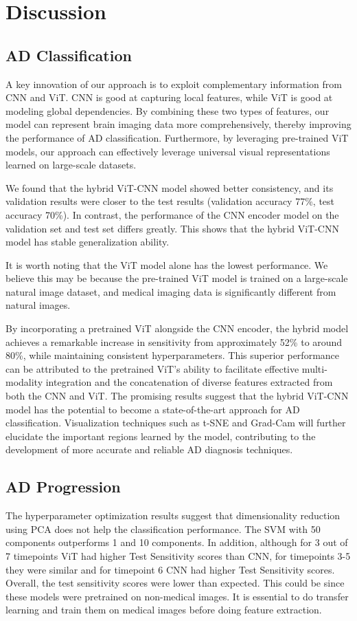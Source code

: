\section{Discussion}
\label{sec:discussion}
\subsection{AD Classification}
A key innovation of our approach is to exploit complementary information from CNN and ViT. CNN is good at capturing local features, while ViT is good at modeling global dependencies. By combining these two types of features, our model can represent brain imaging data more comprehensively, thereby improving the performance of AD classification. Furthermore, by leveraging pre-trained ViT models, our approach can effectively leverage universal visual representations learned on large-scale datasets. 

We found that the hybrid ViT-CNN model showed better consistency, and its validation results were closer to the test results (validation accuracy 77\%, test accuracy 70\%). In contrast, the performance of the CNN encoder model on the validation set and test set differs greatly. This shows that the hybrid ViT-CNN model has stable generalization ability. 

It is worth noting that the ViT model alone has the lowest performance. We believe this may be because the pre-trained ViT model is trained on a large-scale natural image dataset, and medical imaging data is significantly different from natural images. 

By incorporating a pretrained ViT alongside the CNN encoder, the hybrid model achieves a remarkable increase in sensitivity from approximately 52\% to around 80\%, while maintaining consistent hyperparameters. This superior performance can be attributed to the pretrained ViT's ability to facilitate effective multi-modality integration and the concatenation of diverse features extracted from both the CNN and ViT. The promising results suggest that the hybrid ViT-CNN model has the potential to become a state-of-the-art approach for AD classification. Visualization techniques such as t-SNE and Grad-Cam will further elucidate the important regions learned by the model, contributing to the development of more accurate and reliable AD diagnosis techniques. 

\subsection{AD Progression}
The hyperparameter optimization results suggest that dimensionality reduction using PCA does not help the classification performance. The SVM with 50 components outperforms 1 and 10 components. In addition, although for 3 out of 7 timepoints ViT had higher Test Sensitivity scores than CNN, for timepoints 3-5 they were similar and for timepoint 6 CNN had higher Test Sensitivity scores. Overall, the test sensitivity scores were lower than expected. This could be since these models were pretrained on non-medical images. It is essential to do transfer learning and train them on medical images before doing feature extraction. 

